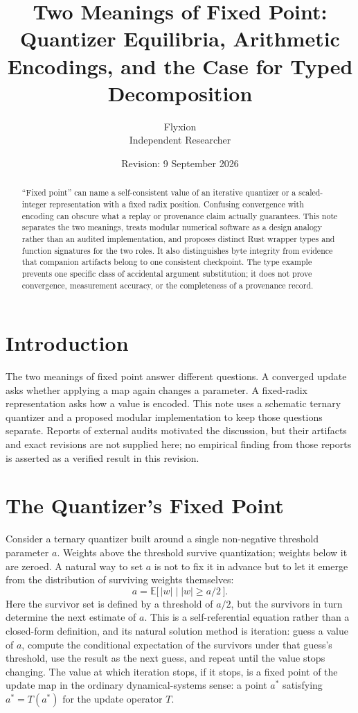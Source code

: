 \documentclass[11pt]{article}
\title{Two Meanings of Fixed Point: Quantizer Equilibria, Arithmetic Encodings, and the Case for Typed Decomposition}
\author{Flyxion \\ \small Independent Researcher}
\date{Revision: 9 September 2026}
\begin{document}
\maketitle

\begin{abstract}
``Fixed point'' can name a self-consistent value of an iterative quantizer or a scaled-integer representation with a fixed radix position. Confusing convergence with encoding can obscure what a replay or provenance claim actually guarantees. This note separates the two meanings, treats modular numerical software as a design analogy rather than an audited implementation, and proposes distinct Rust wrapper types and function signatures for the two roles. It also distinguishes byte integrity from evidence that companion artifacts belong to one consistent checkpoint. The type example prevents one specific class of accidental argument substitution; it does not prove convergence, measurement accuracy, or the completeness of a provenance record.
\end{abstract}

\section{Introduction}

The two meanings of fixed point answer different questions. A converged update asks whether applying a map again changes a parameter. A fixed-radix representation asks how a value is encoded. This note uses a schematic ternary quantizer and a proposed modular implementation to keep those questions separate. Reports of external audits motivated the discussion, but their artifacts and exact revisions are not supplied here; no empirical finding from those reports is asserted as a verified result in this revision.

\section{The Quantizer's Fixed Point}

Consider a ternary quantizer built around a single non-negative threshold parameter $a$. Weights above the threshold survive quantization; weights below it are zeroed. A natural way to set $a$ is not to fix it in advance but to let it emerge from the distribution of surviving weights themselves:
\[
a = \mathbb{E}\bigl[\,|w| \;\big|\; |w| \geq a/2 \,\bigr].
\]
Here the survivor set is defined by a threshold of $a/2$, but the survivors in turn determine the next estimate of $a$. This is a self-referential equation rather than a closed-form definition, and its natural solution method is iteration: guess a value of $a$, compute the conditional expectation of the survivors under that guess's threshold, use the result as the next guess, and repeat until the value stops changing. The value at which iteration stops, if it stops, is a fixed point of the update map in the ordinary dynamical-systems sense: a point $a^*$ satisfying $a^* = T(a^*)$ for the update operator $T$.
\end{document}
